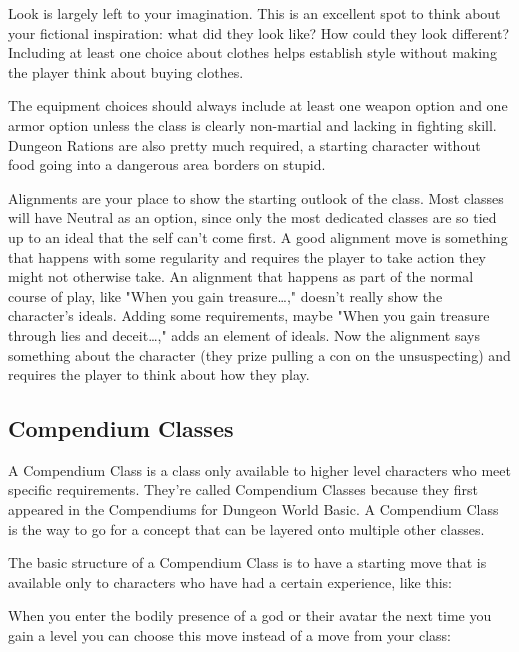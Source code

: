        

Look is largely left to your imagination. This is an excellent spot to think about your fictional inspiration: what did they look like? How could they look different? Including at least one choice about clothes helps establish style without making the player think about buying clothes.

       

The equipment choices should always include at least one weapon option and one armor option unless the class is clearly non-martial and lacking in fighting skill. Dungeon Rations are also pretty much required, a starting character without food going into a dangerous area borders on stupid.

       

Alignments are your place to show the starting outlook of the class. Most classes will have Neutral as an option, since only the most dedicated classes are so tied up to an ideal that the self can't come first. A good alignment move is something that happens with some regularity and requires the player to take action they might not otherwise take. An alignment that happens as part of the normal course of play, like "When you gain treasure…," doesn't really show the character's ideals. Adding some requirements, maybe "When you gain treasure through lies and deceit…," adds an element of ideals. Now the alignment says something about the character (they prize pulling a con on the unsuspecting) and requires the player to think about how they play.

       
\subsection{Compendium Classes}    
       

A Compendium Class is a class only available to higher level characters who meet specific requirements. They're called Compendium Classes because they first appeared in the Compendiums for Dungeon World Basic. A Compendium Class is the way to go for a concept that can be layered onto multiple other classes.

       

The basic structure of a Compendium Class is to have a starting move that is available only to characters who have had a certain experience, like this:

       
\startExample
When you enter the bodily presence of a god or their avatar the next time you gain a level you can choose this move instead of a move from your class:
\stopExample
       
